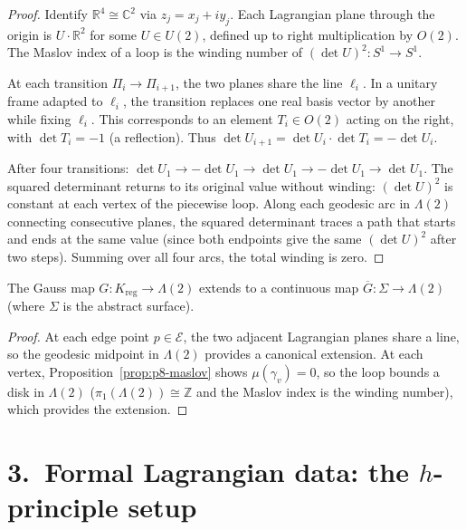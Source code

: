 \begin{proof}
Identify $\mathbb{R}^4\cong\mathbb{C}^2$ via $z_j = x_j + iy_j$.
Each Lagrangian plane through the origin is $U\cdot\mathbb{R}^2$ for some
$U\in U(2)$, defined up to right multiplication by $O(2)$. The Maslov index
of a loop is the winding number of
$(\det U)^2: S^1\to S^1$.

At each transition $\Pi_i\to\Pi_{i+1}$, the two planes share the line
$\ell_i$. In a unitary frame adapted to $\ell_i$, the transition replaces
one real basis vector by another while fixing $\ell_i$. This corresponds to
an element $T_i\in O(2)$ acting on the right, with $\det T_i = -1$
(a reflection). Thus $\det U_{i+1} = \det U_i\cdot\det T_i = -\det U_i$.

After four transitions:
$\det U_1\to -\det U_1\to \det U_1\to -\det U_1\to \det U_1$.
The squared determinant returns to its original value without winding:
$(\det U)^2$ is constant at each vertex of the piecewise loop. Along
each geodesic arc in $\Lambda(2)$ connecting consecutive planes, the
squared determinant traces a path that starts and ends at the same value
(since both endpoints give the same $(\det U)^2$ after two steps). Summing
over all four arcs, the total winding is zero.
\end{proof}

\begin{lemma}
\label{lem:p8-gauss-ext}
The Gauss map $G: K_{\mathrm{reg}}\to\Lambda(2)$ extends to a continuous map
$\overline{G}: \Sigma\to\Lambda(2)$ (where $\Sigma$ is the abstract surface).
\end{lemma}

\begin{proof}
At each edge point $p\in\mathcal{E}$, the two adjacent Lagrangian planes
share a line, so the geodesic midpoint in $\Lambda(2)$ provides a canonical
extension. At each vertex, Proposition~\ref{prop:p8-maslov} shows
$\mu(\gamma_v)=0$, so the loop bounds a disk in $\Lambda(2)$
($\pi_1(\Lambda(2))\cong\mathbb{Z}$ and the Maslov index is the winding
number), which provides the extension.
\end{proof}

\section*{3.\ Formal Lagrangian data: the $h$-principle setup}
\label{sec:p8-hprinciple}

